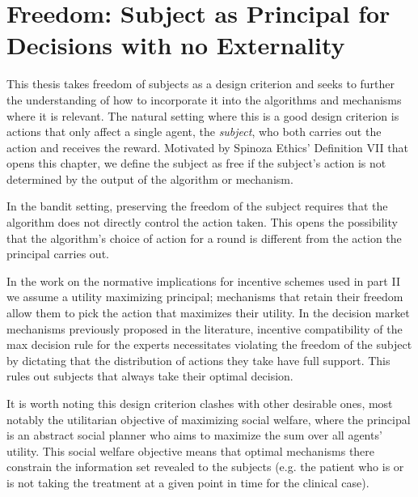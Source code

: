 \section{Freedom: Subject as Principal for Decisions with no Externality}

This thesis takes freedom of subjects as a design criterion and seeks to further the understanding of how to incorporate it into the  algorithms and mechanisms where it is relevant.
The natural setting where this is a good design criterion is actions that only affect a single agent, the \emph{subject}, who both carries out the action and receives the reward.
Motivated by Spinoza Ethics' Definition VII that opens this chapter, we define the subject as free if the subject's action is not determined by the output of the algorithm or mechanism.

In the bandit setting, preserving the freedom of the subject requires that the algorithm does not directly control the action taken.
This opens the possibility that the algorithm's choice of action for a round is different from the action the principal carries out.

In the work on the normative implications for incentive schemes used in part II we assume a utility maximizing principal; mechanisms that retain their freedom allow them to pick the action that maximizes their utility.
In the decision market mechanisms previously proposed in the literature, incentive compatibility of the max decision rule for the experts necessitates \citep{othman2010decision,chen2014eliciting} violating the freedom of the subject by dictating that the distribution of actions they take have full support. This rules out subjects that always take their optimal decision.


It is worth noting this design criterion clashes with other desirable ones, most notably the utilitarian objective of maximizing social welfare, where the principal is an abstract social planner who aims to maximize the sum over all agents' utility. This social welfare objective means that optimal mechanisms there \citep{kremer2014implementing,mansour2015bayesian,mansour2016bayesian} constrain the information set revealed to the subjects (e.g. the patient who is or is not taking the treatment at a given point in time for the clinical case).







